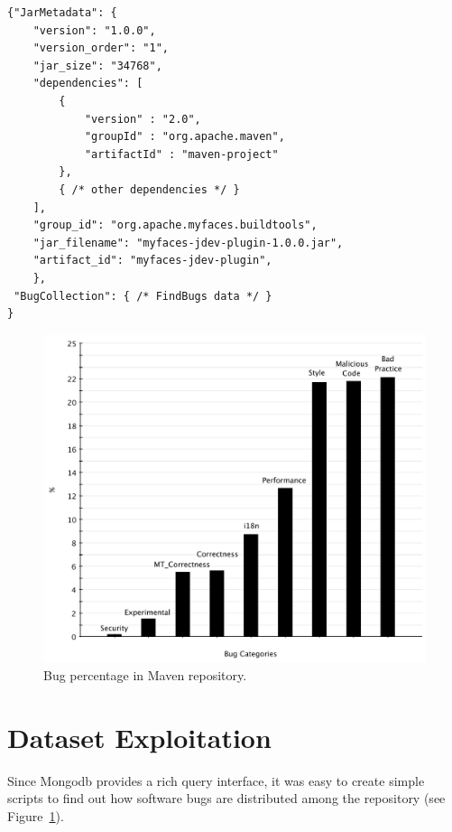 \documentclass{sig-alternate}
\begin{document}
\begin{verbatim}
{"JarMetadata": {
    "version": "1.0.0",
    "version_order": "1",
    "jar_size": "34768",
    "dependencies": [
        {
            "version" : "2.0",
            "groupId" : "org.apache.maven",
            "artifactId" : "maven-project"
        },
        { /* other dependencies */ }
    ],
    "group_id": "org.apache.myfaces.buildtools",
    "jar_filename": "myfaces-jdev-plugin-1.0.0.jar",
    "artifact_id": "myfaces-jdev-plugin",
    }, 
 "BugCollection": { /* FindBugs data */ }
}
\end{verbatim}

\begin{figure}[t]
	\centering
	\includegraphics[scale=0.32]{figures/bug_percent}
	\caption{Bug percentage in Maven repository.}
	\label{fig:bug-per} 
\end{figure}


\section{Dataset Exploitation}
\label{sec:exploit}

Since Mongo{\sc db} provides a rich query interface,
it was easy to create
simple scripts to find out
how software bugs are distributed among the
repository (see Figure~\ref{fig:bug-per}).
\end{document}
